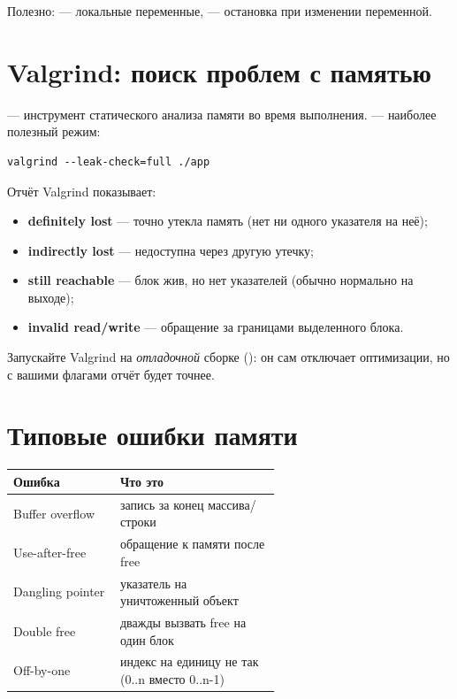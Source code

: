 Полезно:  --- локальные переменные,
 --- остановка при изменении переменной.

\section{Valgrind: поиск проблем с памятью}

 --- инструмент статического анализа
памяти во время выполнения.  ---
наиболее полезный режим:
\begin{verbatim}
valgrind --leak-check=full ./app
\end{verbatim}

Отчёт Valgrind показывает:
\begin{itemize}
  \item \textbf{definitely lost} --- точно утекла память
    (нет ни одного указателя на неё);
  \item \textbf{indirectly lost} --- недоступна через
    другую утечку;
  \item \textbf{still reachable} --- блок жив, но нет
    указателей (обычно нормально на выходе);
  \item \textbf{invalid read/write} --- обращение за
    границами выделенного блока.
\end{itemize}

\begin{tipbox}
Запускайте Valgrind на \emph{отладочной} сборке
(): он сам отключает оптимизации, но
с вашими флагами отчёт будет точнее.
\end{tipbox}

\section{Типовые ошибки памяти}

\begin{center}
\begin{tabular}{lp{0.6\linewidth}}
\toprule
\textbf{Ошибка} & \textbf{Что это} \\
\midrule
Buffer overflow   & запись за конец массива/строки \\
Use-after-free    & обращение к памяти после free \\
Dangling pointer  & указатель на уничтоженный объект \\
Double free       & дважды вызвать free на один блок \\
Off-by-one        & индекс на единицу не так (0..n вместо 0..n-1) \\
\bottomrule
\end{tabular}
\end{center}

